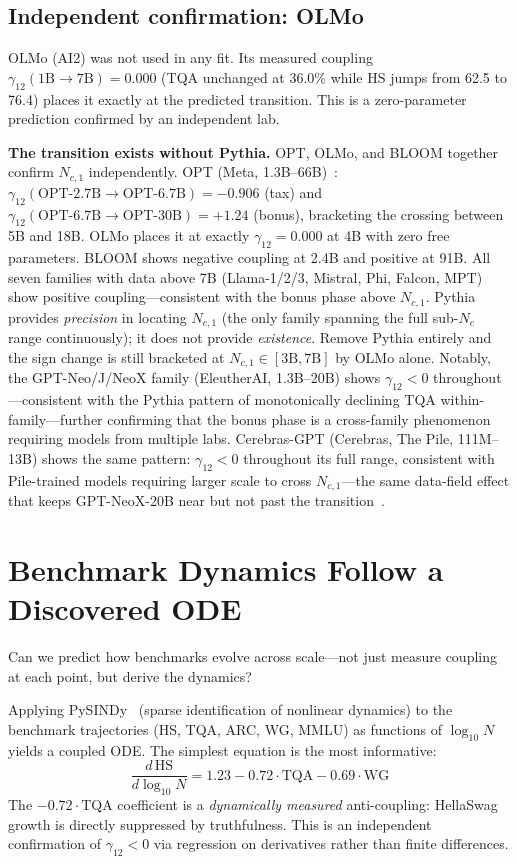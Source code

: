 \documentclass[11pt]{article}
\begin{document}
\subsection{Independent confirmation: OLMo}

OLMo (AI2) was not used in any fit.
Its measured coupling $\gamma_{12}(\text{1B}\to\text{7B}) = 0.000$ (TQA unchanged at 36.0\% while HS jumps from 62.5 to 76.4)
places it exactly at the predicted transition.
This is a zero-parameter prediction confirmed by an independent lab.

\textbf{The transition exists without Pythia.}
OPT, OLMo, and BLOOM together confirm $N_{c,1}$ independently.
OPT (Meta, 1.3B--66B)~\cite{zhang2022opt}: $\gamma_{12}(\text{OPT-2.7B}\to\text{OPT-6.7B}) = -0.906$ (tax) and $\gamma_{12}(\text{OPT-6.7B}\to\text{OPT-30B}) = +1.24$ (bonus), bracketing the crossing between 5B and 18B.
OLMo places it at exactly $\gamma_{12}=0.000$ at 4B with zero free parameters.
BLOOM shows negative coupling at 2.4B and positive at 91B.
All seven families with data above 7B (Llama-1/2/3, Mistral, Phi, Falcon, MPT) show positive coupling---consistent with the bonus phase above $N_{c,1}$.
Pythia provides \emph{precision} in locating $N_{c,1}$ (the only family spanning the full sub-$N_c$ range continuously); it does not provide \emph{existence}.
Remove Pythia entirely and the sign change is still bracketed at $N_{c,1} \in [3\text{B}, 7\text{B}]$ by OLMo alone.
Notably, the GPT-Neo/J/NeoX family (EleutherAI, 1.3B--20B) shows $\gamma_{12} < 0$ throughout---consistent with the Pythia pattern of monotonically declining TQA within-family---further confirming that the bonus phase is a cross-family phenomenon requiring models from multiple labs.
Cerebras-GPT (Cerebras, The Pile, 111M--13B) shows the same pattern: $\gamma_{12} < 0$ throughout its full range, consistent with Pile-trained models requiring larger scale to cross $N_{c,1}$---the same data-field effect that keeps GPT-NeoX-20B near but not past the transition~\cite{dey2023cerebras}.

\section{Benchmark Dynamics Follow a Discovered ODE}
\label{sec:ode}

Can we predict how benchmarks evolve across scale---not just measure coupling at each point, but derive the dynamics?

Applying PySINDy~\cite{brunton2016} (sparse identification of nonlinear dynamics)
to the benchmark trajectories (HS, TQA, ARC, WG, MMLU) as functions of $\log_{10} N$ yields a coupled ODE.
The simplest equation is the most informative:
\begin{equation}
  \frac{d\,\mathrm{HS}}{d\log_{10}N} = 1.23 - 0.72\cdot\mathrm{TQA} - 0.69\cdot\mathrm{WG}
  \label{eq:sindy}
\end{equation}
The $-0.72\cdot\mathrm{TQA}$ coefficient is a \emph{dynamically measured} anti-coupling: HellaSwag growth is directly suppressed by truthfulness.
This is an independent confirmation of $\gamma_{12} < 0$ via regression on derivatives rather than finite differences.
\end{document}
